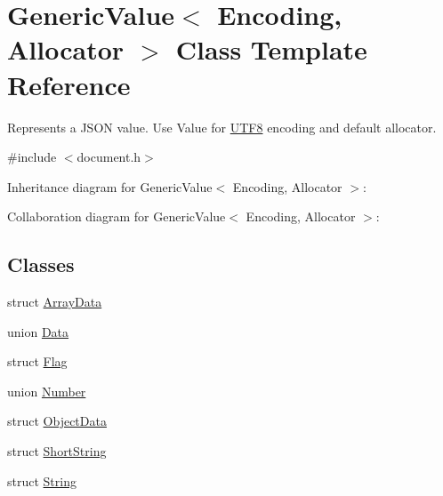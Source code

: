 \hypertarget{class_generic_value}{}\section{Generic\+Value$<$ Encoding, Allocator $>$ Class Template Reference}
\label{class_generic_value}


Represents a J\+S\+ON value. Use Value for \hyperlink{struct_u_t_f8}{U\+T\+F8} encoding and default allocator.  




{\ttfamily \#include $<$document.\+h$>$}



Inheritance diagram for Generic\+Value$<$ Encoding, Allocator $>$\+:


Collaboration diagram for Generic\+Value$<$ Encoding, Allocator $>$\+:
\subsection*{Classes}
\begin{DoxyCompactItemize}
\item 
struct \hyperlink{struct_generic_value_1_1_array_data}{Array\+Data}
\item 
union \hyperlink{union_generic_value_1_1_data}{Data}
\item 
struct \hyperlink{struct_generic_value_1_1_flag}{Flag}
\item 
union \hyperlink{union_generic_value_1_1_number}{Number}
\item 
struct \hyperlink{struct_generic_value_1_1_object_data}{Object\+Data}
\item 
struct \hyperlink{struct_generic_value_1_1_short_string}{Short\+String}
\item 
struct \hyperlink{struct_generic_value_1_1_string}{String}
\end{DoxyCompactItemize}
